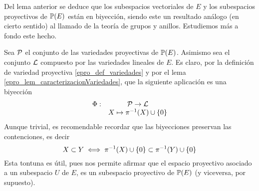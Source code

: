 Del lema anterior se deduce que los subespacios vectoriales de $E$ y los subespacios proyectivos de $\mathbb{P}(E)$ están en biyección, siendo este un resultado análogo (en cierto sentido) al llamado  de la teoría de grupos y anillos. Estudiemos más a fondo este hecho.
\begin{obs}
	Sea $\mathcal{P}$ el conjunto de las variedades proyectivas de $\mathbb{P}(E)$. Asimismo sea el conjunto $\mathcal{L}$ compuesto por las variedades lineales de $E$. Es claro, por la definición de variedad proyectiva \eqref{epro_def_variedades} y por el lema \ref{epro_lem_caracterizacionVariedades}, que la siguiente aplicación es una biyección
	\begin{equation*}
	\begin{array}{cc}
	\Phi:&\mathcal{P}\to\mathcal{L}\\
	&X\mapsto\pi^{-1}(X)\cup\{0\}
	\end{array}
	\end{equation*}
	Aunque trivial, es recomendable recordar que las biyecciones preservan las contenciones, es decir
	\begin{equation*}
	X\subset Y \iff \pi^{-1}(X)\cup\{0\}\subset \pi^{-1}(Y)\cup\{0\}
	\end{equation*}
	Esta tontuna es útil, pues nos permite afirmar que el espacio proyectivo asociado a un subespacio $U$ de $E$, es un subespacio proyectivo de $\mathbb{P}(E)$ (y viceversa, por supuesto).
\end{obs}
